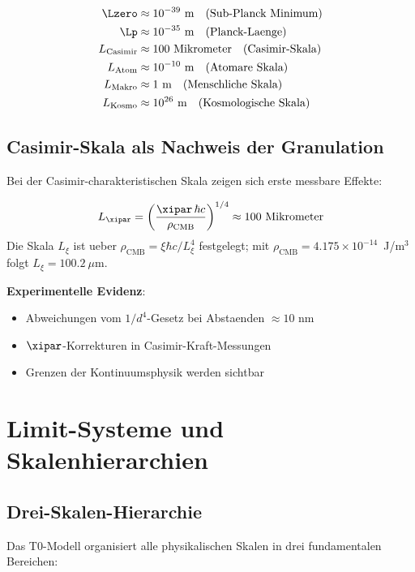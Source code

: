 	\begin{align}
		\Lzero &\approx 10^{-39} \text{ m} \quad \text{(Sub-Planck Minimum)} \\
		\Lp &\approx 10^{-35} \text{ m} \quad \text{(Planck-Laenge)} \\
		L_{\text{Casimir}} &\approx 100 \text{ Mikrometer} \quad \text{(Casimir-Skala)} \\
		L_{\text{Atom}} &\approx 10^{-10} \text{ m} \quad \text{(Atomare Skala)} \\
		L_{\text{Makro}} &\approx 1 \text{ m} \quad \text{(Menschliche Skala)} \\
		L_{\text{Kosmo}} &\approx 10^{26} \text{ m} \quad \text{(Kosmologische Skala)}
	\end{align}
	
	\subsection{Casimir-Skala als Nachweis der Granulation}
	
	Bei der Casimir-charakteristischen Skala zeigen sich erste messbare Effekte:
	
	\begin{equation}
		L_{\xipar} = \left(\frac{\xipar\,\hbar c}{\rho_{\text{CMB}}}\right)^{1/4} \approx 100 \text{ Mikrometer}
	\end{equation}
	Die Skala $L_\xi$ ist ueber $\rho_{\text{CMB}} = \xi\hbar c/L_\xi^4$ festgelegt; mit $\rho_{\text{CMB}} = 4.175 \times 10^{-14}$~J/m$^3$ folgt $L_\xi = 100.2~\mu$m.
	
	\textbf{Experimentelle Evidenz}:
	\begin{itemize}
		\item Abweichungen vom $1/d^4$-Gesetz bei Abstaenden $\approx 10$ nm
		\item $\xipar$-Korrekturen in Casimir-Kraft-Messungen
		\item Grenzen der Kontinuumsphysik werden sichtbar
	\end{itemize}
	
	\section{Limit-Systeme und Skalenhierarchien}
	
	\subsection{Drei-Skalen-Hierarchie}
	
	Das T0-Modell organisiert alle physikalischen Skalen in drei fundamentalen Bereichen:
	
